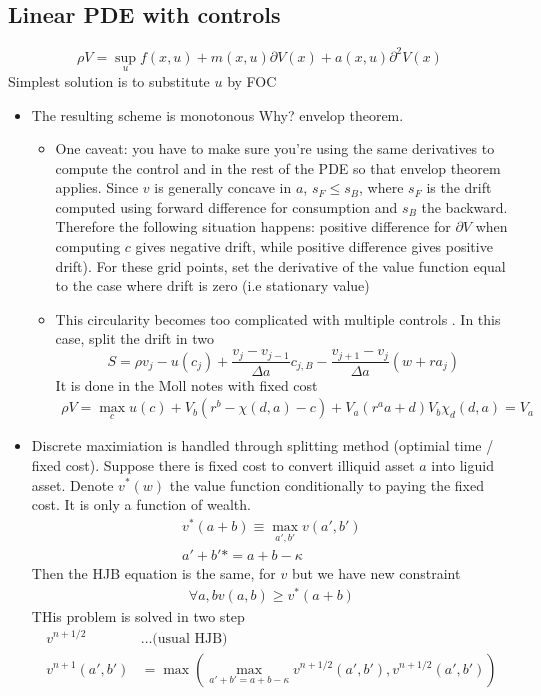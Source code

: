 \documentclass[english]{article}
\begin{document}
\subsection{Linear PDE with controls}
$$\rho V = \sup_u f(x, u) + m(x, u) \partial V(x) + a(x, u) \partial^2 V(x)$$
Simplest solution is to substitute $u$ by FOC
\begin{itemize}
	\item The resulting scheme is monotonous Why? envelop theorem.
	\begin{itemize}
		\item     One caveat: you have to make sure you're using the same derivatives to compute the control and in the rest of the PDE so that envelop theorem applies.
		Since $v$ is generally concave in $a$, $s_F \leq s_B$, where $s_F$ is the drift computed using forward difference for consumption and $s_B$ the backward. Therefore the following situation happens: positive difference for $\partial V$ when computing $c$ gives negative drift, while positive difference gives positive drift). For these grid points, set the derivative of the value function equal to the case where drift is zero (i.e stationary value)
		\item This circularity becomes too complicated with multiple controls . In this case, split the drift in two
		$$S = \rho v_j - u(c_j) + \frac{v_j-v_{j-1}}{\Delta a} c_{j, B} - \frac{v_{j+1}-v_j}{\Delta a} (w + ra_j)$$
		It is done in the Moll notes with fixed cost
		\begin{align*}
			\rho V =\max_c u(c) + V_b(r^b-\chi(d, a) - c) + V_a(r^a a + d)
			V_b \chi_d(d, a) = V_a
		\end{align*}
	\end{itemize}
	\item  Discrete maximiation is handled through splitting method (optimial time / fixed cost).	Suppose there is fixed cost to convert illiquid asset $a$ into liguid asset.	Denote $v^*(w)$ the value function conditionally to paying the fixed cost. It is only a function of wealth.
	\begin{align*}
		v^*(a+b) \equiv \max_{a', b'} v(a', b') \\
		a' + b' * = a + b - \kappa
	\end{align*}
	Then the HJB equation is the same, for $v$ but we have new constraint
	\begin{align*}
		\forall a, b	v(a, b) \geq v^*(a + b)
	\end{align*}
	THis problem is solved in two step
	\begin{align*}
		v^{n+1/2} &\dots \text{(usual HJB)}\\
		v^{n+1}(a', b') &= \max(\max_{a' + b' = a + b - \kappa} v^{n+1/2} (a', b'), v^{n+1/2}(a', b'))
	\end{align*}
\end{itemize}
\end{document}
